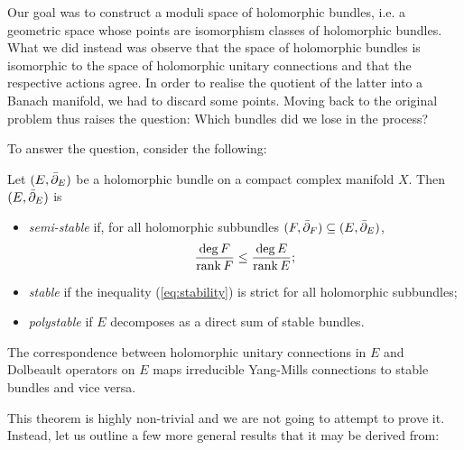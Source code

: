 \documentclass[12pt]{ociamthesis}  %
\begin{document}
Our goal was to construct a moduli space of holomorphic bundles,
i.e. a geometric space whose points are isomorphism classes of
holomorphic bundles. What we did instead was observe that the space
of holomorphic bundles is isomorphic to the space of holomorphic unitary
connections and that the respective actions agree. In order to realise
the quotient of the latter into a Banach manifold, we had to discard
some points. Moving back to the original problem thus raises
the question: Which bundles did we lose in the process?

To answer the question, consider the following:
\begin{definition}
  Let $(E,{\bar{\partial}}_E)$ be a holomorphic bundle on a compact complex
  manifold $X$. Then $(E,{\bar{\partial}}_E)$ is
  \begin{itemize}
    \item \emph{semi-stable} if, for all holomorphic subbundles
          $(F,{\bar{\partial}}_F)\subseteq (E,{\bar{\partial}}_E)$,
          \begin{align}\label{eq:stability}
            \frac{\deg F}{\operatorname{rank} F} \leq \frac{\deg E}{\operatorname{rank} E};
          \end{align}
    \item \emph{stable} if the inequality (\ref{eq:stability})
          is strict for all holomorphic subbundles;
    \item \emph{polystable} if $E$ decomposes as a direct sum of
          stable bundles.
  \end{itemize}
\end{definition}

\begin{theorem}\label{thm:duy}
  The correspondence between holomorphic unitary connections in $E$ and
  Dolbeault operators on $E$ maps irreducible Yang-Mills connections to
  stable bundles and vice versa.
\end{theorem}

This theorem is highly non-trivial and we are not going to attempt
to prove it. Instead, let us outline a few more general results
that it may be derived from:
\end{document}
